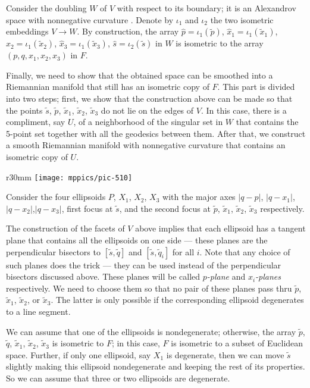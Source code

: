 \documentclass{article}
\begin{document}
Consider the doubling $W$ of $V$ with respect to its boundary;
it is an Alexandrov space with nonnegative curvature \cite[5.2]{perelman:spaces2}.
Denote by $\iota_1$ and $\iota_2$ the two isometric embeddings $V\to W$.
By construction, the array $\hat p=\iota_1(\tilde p)$, $\hat x_1=\iota_1(\tilde x_1)$, $\hat x_2=\iota_1(\tilde x_2)$, $\hat x_3=\iota_1(\tilde x_3)$,  $\hat s=\iota_2(\tilde s)$ in $W$ is isometric to the array $(p, q, x_1, x_2, x_3)$ in $F$.

\medskip

Finally, we need to show that the obtained space can be smoothed into a Riemannian manifold that still has an isometric copy of $F$.
This part is divided into two steps; first, we show that the construction above can be made so that the points $\tilde s$, $\tilde p$, $\tilde x_1$, $\tilde x_2$, $\tilde x_3$ do not lie on the edges of $V$.
In this case, there is a compliment, say $U$, of a neighborhood of the singular set in $W$ that contains
the 5-point set together with all the geodesics between them.
After that, we construct a smooth Riemannian manifold with nonnegative curvature that contains an isometric copy of $U$.

\begin{wrapfigure}{r}{30mm}
\vskip-0mm
\centering
\texttt{[image: mppics/pic-510]}
\end{wrapfigure}

Consider the four ellipsoids $P$, $X_1$, $X_2$, $X_3$ with the major axes $|q-p|$, $|q-x_1|$, $|q-x_2|$,$|q-x_3|$, first focus at $\tilde s$, and the second focus at $\tilde p$, $\tilde x_1$, $\tilde x_2$, $\tilde x_3$ respectively.

The construction of the facets of $V$ above implies that each ellipsoid has a tangent plane that contains all the ellipsoids on one side --- these planes are the perpendicular bisectors to $[\tilde s,\tilde q]$ and $[\tilde s,\tilde q_i]$ for all $i$.
Note that any choice of such planes does the trick --- they can be used instead of the perpendicular bisectors discussed above.
These planes will be called \emph{$p$-plane} and \emph{$x_i$-planes} respectively.
We need to choose them so that no pair of these planes pass thru $\tilde p$, $\tilde x_1$, $\tilde x_2$, or $\tilde x_3$.
The latter is only possible if the corresponding ellipsoid degenerates to a line segment.

We can assume that one of the ellipsoids is nondegenerate; otherwise, the array $\tilde p$, $\tilde q$, $\tilde x_1$, $\tilde x_2$, $\tilde x_3$ is isometric to $F$;
in this case, $F$ is isometric to a subset of Euclidean space.
Further, if only one ellipsoid, say $X_1$ is degenerate, then we can move $\tilde s$ slightly making this ellipsoid nondegenerate and keeping the rest of its properties.
So we can assume that three or two ellipsoids are degenerate.
\end{document}
